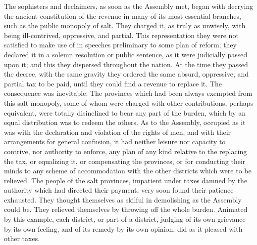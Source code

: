 The sophisters and declaimers, as soon as the Assembly met, began with decrying the ancient constitution of the revenue in many of its most essential branches, such as the public monopoly of salt. They charged it, as truly as unwisely, with being ill-contrived, oppressive, and partial. This representation they were not satisfied to make use of in speeches preliminary to some plan of reform; they declared it in a solemn resolution or public sentence, as it were judicially passed upon it; and this they dispersed throughout the nation. At the time they passed the decree, with the same gravity they ordered the same absurd, oppressive, and partial tax to be paid, until they could find a revenue to replace it. The consequence was inevitable. The provinces which had been always exempted from this salt monopoly, some of whom were charged with other contributions, perhaps equivalent, were totally disinclined to bear any part of the burden, which by an equal distribution was to redeem the others. As to the Assembly, occupied as it was with the declaration and violation of the rights of men, and with their arrangements for general confusion, it had neither leisure nor capacity to contrive, nor authority to enforce, any plan of any kind relative to the replacing the tax, or equalizing it, or compensating the provinces, or for conducting their minds to any scheme of accommodation with the other districts which were to be relieved. The people of the salt provinces, impatient under taxes damned by the authority which had directed their payment, very soon found their patience exhausted. They thought themselves as skilful in demolishing as the Assembly could be. They relieved themselves by throwing off the whole burden. Animated by this example, each district, or part of a district, judging of its own grievance by its own feeling, and of its remedy by its own opinion, did as it pleased with other taxes.

